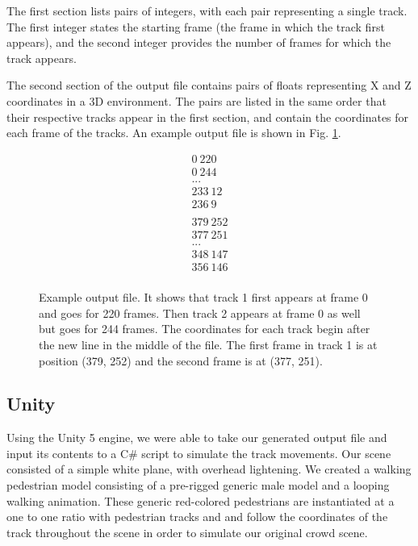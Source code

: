 \documentclass[12pt, onecolumn, conference]{IEEEtran}
\begin{document}
The first section lists pairs of integers, with each pair representing a single track. The first integer states the starting frame (the frame in which the track first appears), and the second integer provides the number of frames for which the track appears. 

The second section of the output file contains pairs of floats representing X and Z coordinates in a 3D environment. The pairs are listed in the same order that their respective tracks appear in the first section, and contain the coordinates for each frame of the tracks. An example output file is shown in Fig. \ref{Output}.

\begin{figure}
\begin{gather*}
0\ 220 \\
0\ 244 \\
...  \\
233\ 12 \\
236\ 9   \\
 \\
379\ 252 \\
377\ 251 \\
...  \\
348\ 147 \\
356\ 146 \\
\end{gather*}
\caption{Example output file. It shows that track 1 first appears at frame 0 and goes for 220 frames. Then track 2 appears at frame 0 as well but goes for 244 frames. The coordinates for each track begin after the new line in the middle of the file. The first frame in track 1 is at position (379, 252) and the second frame is at (377, 251).}
\label{Output}
\end{figure}

\subsection{Unity}

Using the Unity 5 engine, we were able to take our generated output file and input its contents to a C\# script to simulate the track movements. Our scene consisted of a simple white plane, with overhead lightening. We created a walking pedestrian model consisting of a pre-rigged generic male model and a looping walking animation. These generic red-colored pedestrians are instantiated at a one to one ratio with pedestrian tracks and and follow the coordinates of the track throughout the scene in order to simulate our original crowd scene. 
\end{document}
